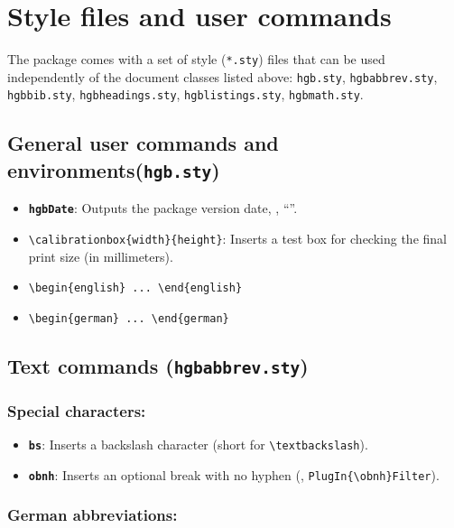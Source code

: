 \documentclass[english]{hgbarticle}
\begin{document}
\section{Style files and user commands}

The package comes with a set of style (\texttt{*.sty}) files that can be used
independently of the document classes listed above:
\texttt{hgb.sty},
\texttt{hgbabbrev.sty},
\texttt{hgbbib.sty},
\texttt{hgbheadings.sty},
\texttt{hgblistings.sty},
\texttt{hgbmath.sty}.


\subsection{General user commands and environments(\texttt{hgb.sty})}

\begin{itemize}
    \item \textbf{\texttt{{\bs}hgbDate}}: Outputs the package version date,
    \eg, ``\texttt{\hgbDate}''.
    \item \verb!\calibrationbox{width}{height}!: Inserts a test box for
    checking the final print size (in millimeters).
    \item \verb!\begin{english} ... \end{english}!
    \item \verb!\begin{german} ... \end{german}!
\end{itemize}


\subsection{Text commands (\texttt{hgbabbrev.sty})}

\subsubsection*{Special characters:}

\begin{itemize}
    \item \textbf{\texttt{{\bs}bs}}: Inserts a backslash character (short for
    \verb!\textbackslash!).
    \item \textbf{\texttt{{\bs}obnh}}: Inserts an optional break with no
    hyphen (\eg, \verb!PlugIn{\obnh}Filter!).
\end{itemize}


\subsubsection*{German abbreviations:}
\end{document}

